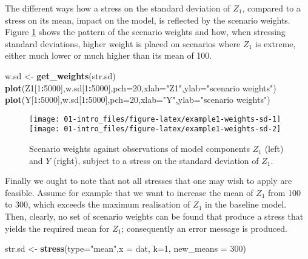 \documentclass[]{article}
\newenvironment{Shaded}{\begin{snugshade}}{\end{snugshade}}
\newcommand{\DataTypeTok}[1]{\textcolor[rgb]{0.13,0.29,0.53}{#1}}
\newcommand{\DecValTok}[1]{\textcolor[rgb]{0.00,0.00,0.81}{#1}}
\newcommand{\KeywordTok}[1]{\textcolor[rgb]{0.13,0.29,0.53}{\textbf{#1}}}
\newcommand{\NormalTok}[1]{#1}
\newcommand{\OperatorTok}[1]{\textcolor[rgb]{0.81,0.36,0.00}{\textbf{#1}}}
\newcommand{\StringTok}[1]{\textcolor[rgb]{0.31,0.60,0.02}{#1}}
\begin{document}
The different ways how a stress on the standard deviation of \(Z_1\), compared to a stress on its mean, impact on the model, is reflected by the scenario weights. Figure \ref{fig:example1-weights-sd} shows the pattern of the scenario weights and how, when stressing standard deviations, higher weight is placed on scenarios where \(Z_1\) is extreme, either much lower or much higher than its mean of 100.

\begin{Shaded}
\begin{Highlighting}[]
\NormalTok{w.sd <-}\StringTok{ }\KeywordTok{get_weights}\NormalTok{(str.sd)}
\KeywordTok{plot}\NormalTok{(Z1[}\DecValTok{1}\OperatorTok{:}\DecValTok{5000}\NormalTok{],w.sd[}\DecValTok{1}\OperatorTok{:}\DecValTok{5000}\NormalTok{],}\DataTypeTok{pch=}\DecValTok{20}\NormalTok{,}\DataTypeTok{xlab=}\StringTok{"Z1"}\NormalTok{,}\DataTypeTok{ylab=}\StringTok{"scenario weights"}\NormalTok{)}
\KeywordTok{plot}\NormalTok{(Y[}\DecValTok{1}\OperatorTok{:}\DecValTok{5000}\NormalTok{],w.sd[}\DecValTok{1}\OperatorTok{:}\DecValTok{5000}\NormalTok{],}\DataTypeTok{pch=}\DecValTok{20}\NormalTok{,}\DataTypeTok{xlab=}\StringTok{"Y"}\NormalTok{,}\DataTypeTok{ylab=}\StringTok{"scenario weights"}\NormalTok{)}
\end{Highlighting}
\end{Shaded}

\begin{figure}
\texttt{[image: 01-intro\_files/figure-latex/example1-weights-sd-1]} \texttt{[image: 01-intro\_files/figure-latex/example1-weights-sd-2]} \caption{Scenario weights against observations of model components  $Z_1$ (left) and $Y$ (right), subject to a stress on the standard deviation of $Z_1$.}\label{fig:example1-weights-sd}
\end{figure}

Finally we ought to note that not all stresses that one may wish to apply are feasible. Assume for example that we want to increase the mean of \(Z_1\) from 100 to 300, which exceeds the maximum realisation of \(Z_1\) in the baseline model. Then, clearly, no set of scenario weights can be found that produce a stress that yields the required mean for \(Z_1\); consequently an error message is produced.

\begin{Shaded}
\begin{Highlighting}[]
\NormalTok{str.sd <-}\StringTok{ }\KeywordTok{stress}\NormalTok{(}\DataTypeTok{type=}\StringTok{"mean"}\NormalTok{,}\DataTypeTok{x =}\NormalTok{ dat, }\DataTypeTok{k=}\DecValTok{1}\NormalTok{, }\DataTypeTok{new_means =} \DecValTok{300}\NormalTok{)}
\end{Highlighting}
\end{Shaded}
\end{document}
